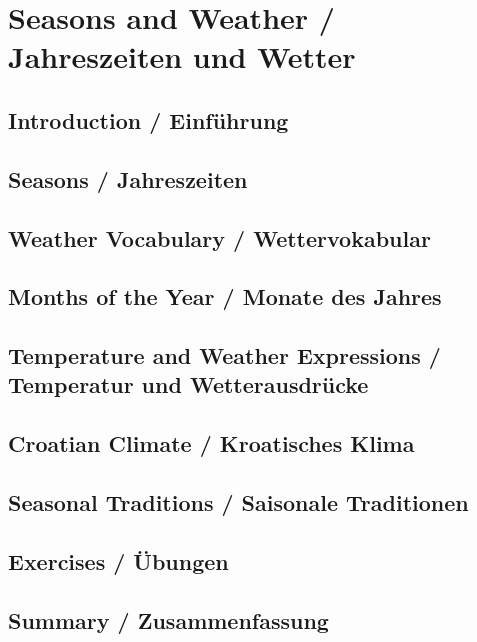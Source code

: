 \chapter{Seasons and Weather / Jahreszeiten und Wetter}

\section{Introduction / Einführung}

\section{Seasons / Jahreszeiten}

\section{Weather Vocabulary / Wettervokabular}

\section{Months of the Year / Monate des Jahres}

\section{Temperature and Weather Expressions / Temperatur und Wetterausdrücke}

\section{Croatian Climate / Kroatisches Klima}

\section{Seasonal Traditions / Saisonale Traditionen}

\section{Exercises / Übungen}

\section{Summary / Zusammenfassung}
